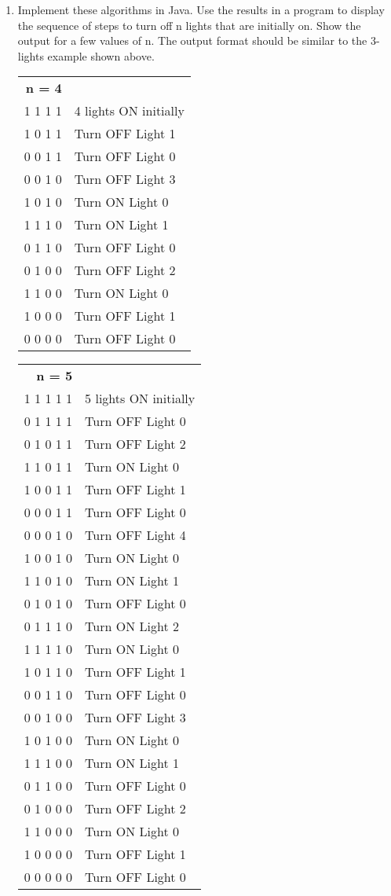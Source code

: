 \documentclass[12pt, a4paper, twoside]{article}
\begin{document}
\begin{enumerate}
\begin{enumerate}[leftmargin=0cm,itemindent=.5cm,labelwidth=\itemindent,labelsep=.2cm,align=left]
  \item Implement these algorithms in Java. Use the results in a program to display the sequence of steps to turn off n lights that are initially on. Show the output for a few values of n. The output format should be similar to the 3-lights example shown above.\\
  \begin{tabular}{rl}
    \textbf{n = 4}&\\
    1 1 1 1& 	 4 lights ON initially\\
    1 0 1 1& 	 Turn OFF Light 1\\
    0 0 1 1& 	 Turn OFF Light 0\\
    0 0 1 0& 	 Turn OFF Light 3\\
    1 0 1 0& 	 Turn ON Light 0\\
    1 1 1 0& 	 Turn ON Light 1\\
    0 1 1 0& 	 Turn OFF Light 0\\
    0 1 0 0& 	 Turn OFF Light 2\\
    1 1 0 0& 	 Turn ON Light 0\\
    1 0 0 0& 	 Turn OFF Light 1\\
    0 0 0 0& 	 Turn OFF Light 0
  \end{tabular}

  \begin{tabular}{rl}
    \textbf{n = 5}&\\
    1 1 1 1 1& 	 5 lights ON initially\\
    0 1 1 1 1& 	 Turn OFF Light 0\\
    0 1 0 1 1& 	 Turn OFF Light 2\\
    1 1 0 1 1& 	 Turn ON Light 0\\
    1 0 0 1 1& 	 Turn OFF Light 1\\
    0 0 0 1 1& 	 Turn OFF Light 0\\
    0 0 0 1 0& 	 Turn OFF Light 4\\
    1 0 0 1 0& 	 Turn ON Light 0\\
    1 1 0 1 0& 	 Turn ON Light 1\\
    0 1 0 1 0& 	 Turn OFF Light 0\\
    0 1 1 1 0& 	 Turn ON Light 2\\
    1 1 1 1 0& 	 Turn ON Light 0\\
    1 0 1 1 0& 	 Turn OFF Light 1\\
    0 0 1 1 0& 	 Turn OFF Light 0\\
    0 0 1 0 0& 	 Turn OFF Light 3\\
    1 0 1 0 0& 	 Turn ON Light 0\\
    1 1 1 0 0& 	 Turn ON Light 1\\
    0 1 1 0 0& 	 Turn OFF Light 0\\
    0 1 0 0 0& 	 Turn OFF Light 2\\
    1 1 0 0 0& 	 Turn ON Light 0\\
    1 0 0 0 0& 	 Turn OFF Light 1\\
    0 0 0 0 0& 	 Turn OFF Light 0
  \end{tabular}


\end{enumerate}
\end{enumerate}
\end{document}
